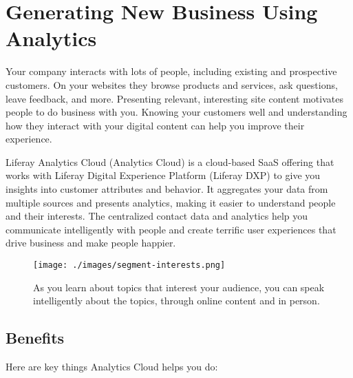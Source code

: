 \chapter{Generating New Business Using
Analytics}\label{generating-new-business-using-analytics}

Your company interacts with lots of people, including existing and
prospective customers. On your websites they browse products and
services, ask questions, leave feedback, and more. Presenting relevant,
interesting site content motivates people to do business with you.
Knowing your customers well and understanding how they interact with
your digital content can help you improve their experience.

Liferay Analytics Cloud (Analytics Cloud) is a cloud-based SaaS offering
that works with Liferay Digital Experience Platform (Liferay DXP) to
give you insights into customer attributes and behavior. It aggregates
your data from multiple sources and presents analytics, making it easier
to understand people and their interests. The centralized contact data
and analytics help you communicate intelligently with people and create
terrific user experiences that drive business and make people happier.

\begin{figure}
\centering
\texttt{[image: ./images/segment-interests.png]}
\caption{As you learn about topics that interest your audience, you can
speak intelligently about the topics, through online content and in
person.}
\end{figure}

\section{Benefits}\label{benefits}

Here are key things Analytics Cloud helps you do:

